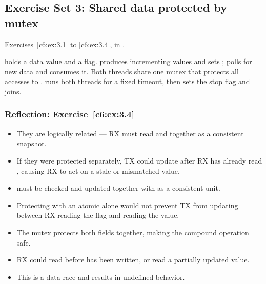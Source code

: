 \subsection{Exercise Set 3: Shared data protected by mutex}
\label{sol:set:c6.3}
Exercises~\ref{c6:ex:3.1} to \ref{c6:ex:3.4}, in .

 holds a  data value and a  flag.
 produces incrementing values and sets ;  polls for
new data and consumes it. Both threads share one mutex that protects all accesses to
.  runs both threads for a fixed timeout, then sets the stop flag and
joins.


\subsubsection{Reflection: Exercise~\ref{c6:ex:3.4}}
\begin{itemize}
  \item They are logically related --- RX must read  and  together as a
    consistent snapshot.
  \item If they were protected separately, TX could update  after RX has already read
    , causing RX to act on a stale or mismatched value.
\end{itemize}

\begin{itemize}
  \item {} must be checked and updated together with  as a consistent unit.
  \item Protecting  with an atomic alone would not prevent TX from updating
     between RX reading the flag and reading the value.
  \item The mutex protects both fields together, making the compound operation safe.
\end{itemize}

\begin{itemize}
  \item RX could read  before  has been written, or read a
    partially updated  value.
  \item This is a data race and results in undefined behavior.
\end{itemize}

